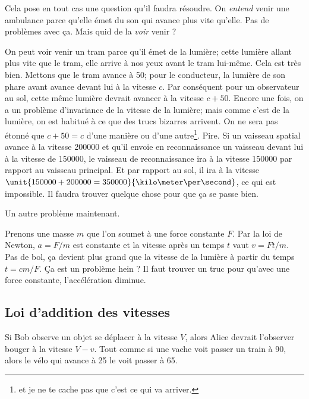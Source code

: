 Cela pose en tout cas une question qu'il faudra résoudre. On \emph{entend} venir une ambulance parce qu'elle émet du son qui avance plus vite qu'elle. Pas de problèmes avec ça. Mais quid de la \emph{voir} venir ?

On peut voir venir un tram parce qu'il émet de la lumière; cette lumière allant plus vite que le tram, elle arrive à nos yeux avant le tram lui-même. Cela est très bien. Mettons que le tram avance à \unit{50}{\kilo\meter\per\hour}; pour le conducteur, la lumière de son phare avant avance devant lui à la vitesse \( c\). Par conséquent pour un observateur au sol, cette même lumière devrait avancer à la vitesse \( c+50\). Encore une fois, on a un problème d'invariance de la vitesse de la lumière; mais comme c'est de la lumière, on est habitué à ce que des trucs bizarres arrivent. On ne sera pas étonné que \( c+50=c\) d'une manière ou d'une autre\footnote{et je ne te cache pas que c'est ce qui va arriver.}. Pire. Si un vaisseau spatial avance à la vitesse \unit{200000}{\kilo\meter\per\second} et qu'il envoie en reconnaissance un vaisseau devant lui à la vitesse de \unit{150000}{\kilo\meter\per\second}, le vaisseau de reconnaissance ira à la vitesse \unit{150000}{\kilo\meter\per\second} par rapport au vaisseau principal. Et par rapport au sol, il ira à la vitesse \( \unit{150000+200000=350000}{\kilo\meter\per\second}\), ce qui est impossible. Il faudra trouver quelque chose pour que ça se passe bien.

Un autre problème maintenant.

Prenons une masse \( m\) que l'on soumet à une force constante \( F\). Par la loi de Newton, \( a=F/m\) est constante et la vitesse après un temps \( t\) vaut \( v=Ft/m\). Pas de bol, ça devient plus grand que la vitesse de la lumière à partir du temps \( t=cm/F\). Ça est un problème hein ? Il faut trouver un truc pour qu'avec une force constante, l'accélération diminue.

\subsection{Loi d'addition des vitesses}

Si Bob observe un objet se déplacer à la vitesse \( V\), alors Alice devrait l'observer bouger à la vitesse \( V-v\). Tout comme si une vache voit passer un train à \unit{90}{\kilo\meter\per\hour}, alors le vélo qui avance à \unit{25}{\kilo\meter\per\hour} le voit passer à \unit{65}{\kilo\meter\per\hour}.


